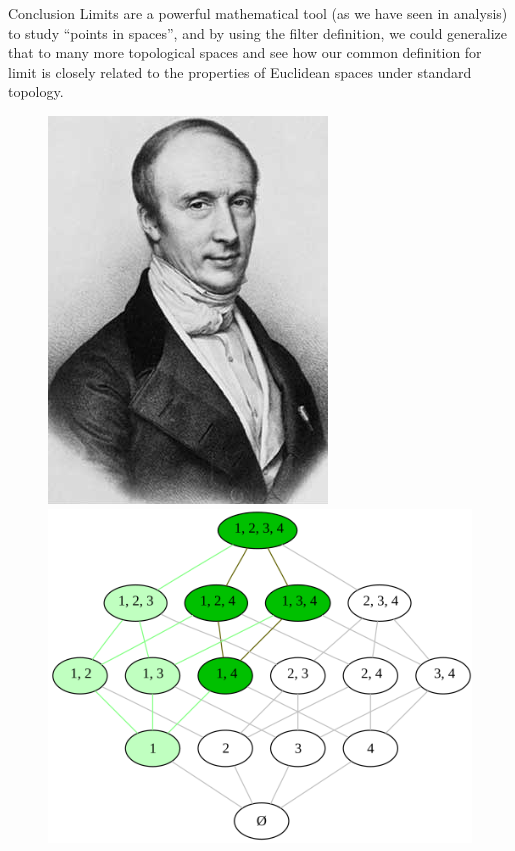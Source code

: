\documentclass[aspectratio=169]{beamer}
\begin{document}
	\begin{frame}{Conclusion}
		Limits are a powerful mathematical tool (as we have seen in analysis) to study ``points in spaces'', and by using the filter definition, we could generalize that to many more topological spaces and see how our common definition for limit is closely related to the properties of Euclidean spaces under standard topology.
		\begin{figure}
			\includegraphics[height=0.4\textheight]{cauchy}
			\includegraphics[height=0.4\textheight]{filter}

\end{figure}
\end{frame}
\end{document}
